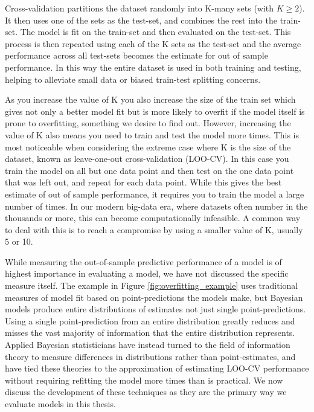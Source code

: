 Cross-validation partitions the dataset randomly into K-many sets (with $K \geq 2$). It then uses one of the sets as the test-set, and combines the rest into the train-set. The model is fit on the train-set and then evaluated on the test-set. This process is then repeated using each of the K sets as the test-set and the average performance across all test-sets becomes the estimate for out of sample performance. In this way the entire dataset is used in both training and testing, helping to alleviate small data or biased train-test splitting concerns.

As you increase the value of K you also increase the size of the train set which gives not only a better model fit but is more likely to overfit if the model itself is prone to overfitting, something we desire to find out. However, increasing the value of K also means you need to train and test the model more times. This is most noticeable when considering the extreme case where K is the size of the dataset, known as leave-one-out cross-validation (LOO-CV). In this case you train the model on all but one data point and then test on the one data point that was left out, and repeat for each data point. While this gives the best estimate of out of sample performance, it requires you to train the model a large number of times. In our modern big-data era, where datasets often number in the thousands or more, this can become computationally infeasible. A common way to deal with this is to reach a compromise by using a smaller value of K, usually 5 or 10.

While measuring the out-of-sample predictive performance of a model is of highest importance in evaluating a model, we have not discussed the specific measure itself. The example in Figure \ref{fig:overfitting_example} uses traditional measures of model fit based on point-predictions the models make, but Bayesian models produce entire distributions of estimates not just single point-predictions. Using a single point-prediction from an entire distribution greatly reduces and misses the vast majority of information that the entire distribution represents. Applied Bayesian statisticians have instead turned to the field of information theory to measure differences in distributions rather than point-estimates, and have tied these theories to the approximation of estimating LOO-CV performance without requiring refitting the model more times than is practical. We now discuss the development of these techniques as they are the primary way we evaluate models in this thesis.

